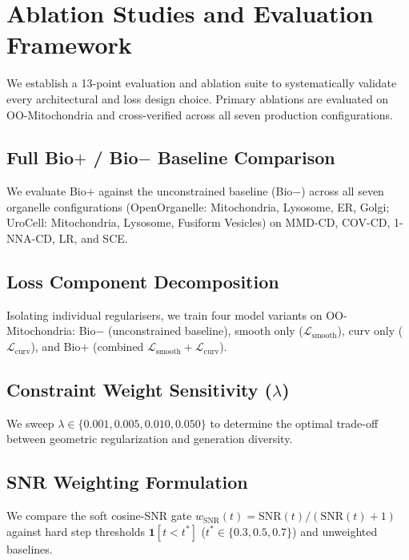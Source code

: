 \documentclass[10pt, a4paper, twocolumn]{article}
\begin{document}
\section{Ablation Studies and Evaluation Framework}
\label{sec:ablations}

We establish a 13-point evaluation and ablation suite to systematically validate every architectural and loss design choice. Primary ablations are evaluated on OO-Mitochondria and cross-verified across all seven production configurations.

\subsection{Full Bio$+$ / Bio$-$ Baseline Comparison}
\label{sec:ablation_bio_on_off}

We evaluate Bio$+$ against the unconstrained baseline (Bio$-$) across all seven organelle configurations (OpenOrganelle: Mitochondria, Lysosome, ER, Golgi; UroCell: Mitochondria, Lysosome, Fusiform Vesicles) on MMD-CD, COV-CD, 1-NNA-CD, LR, and SCE.

\subsection{Loss Component Decomposition}
\label{sec:ablation_bio}

Isolating individual regularisers, we train four model variants on OO-Mitochondria: Bio$-$ (unconstrained baseline), smooth only ($\mathcal{L}_{\text{smooth}}$), curv only ($\mathcal{L}_{\text{curv}}$), and Bio$+$ (combined $\mathcal{L}_{\text{smooth}} + \mathcal{L}_{\text{curv}}$).

\subsection{Constraint Weight Sensitivity ($\lambda$)}
\label{sec:ablation_weight}

We sweep $\lambda \in \{0.001, 0.005, 0.010, 0.050\}$ to determine the optimal trade-off between geometric regularization and generation diversity.

\subsection{SNR Weighting Formulation}
\label{sec:ablation_snr}

We compare the soft cosine-SNR gate $w_{\text{SNR}}(t) = \text{SNR}(t)/(\text{SNR}(t)+1)$ against hard step thresholds $\mathbf{1}[t < t^*]$ ($t^* \in \{0.3, 0.5, 0.7\}$) and unweighted baselines.
\end{document}
